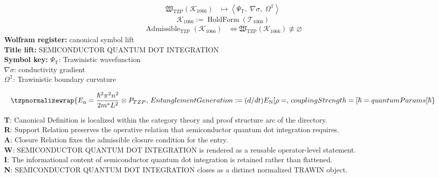 \noindent
\begin{minipage}[t]{0.48\linewidth}
\begingroup
\small
\[
\begin{aligned}
\mathfrak{W}_{\mathrm{TZP}}\!\left(\mathcal{K}_{1066}\right)
&\longmapsto
\left\langle \Psi_{\mathrm{T}},\; \nabla\sigma,\; \Omega^{\mathbb{T}} \right\rangle
\end{aligned}
\]
\[
\mathcal{K}_{1066}
:=
\operatorname{HoldForm}\!\left(\mathcal{T}_{1066}\right)
\]
\[
\begin{aligned}
\operatorname{Admissible}_{\mathrm{TZP}}\!\left(\mathcal{K}_{1066}\right)
&\Longleftrightarrow
\mathfrak{W}_{\mathrm{TZP}}\!\left(\mathcal{K}_{1066}\right)\not\equiv\varnothing
\end{aligned}
\]
\textbf{Wolfram register:} canonical symbol lift\\
\textbf{Title lift:} SEMICONDUCTOR QUANTUM DOT INTEGRATION\\
\textbf{Symbol key:} \(\Psi_{\mathrm{T}}\): Trawinistic wavefunction\\ \(\nabla\sigma\): conductivity gradient\\ \(\Omega^{\mathbb{T}}\): Trawinistic boundary curvature
\par
\endgroup
\end{minipage}\hfill
\begin{minipage}[t]{0.48\linewidth}
\[
\tzpnormalizewrap{E_{\mathrm{n}} = \frac{\hbar^2 \pi^2 n^2}{2m^* L^2} \otimes P_{TZP},\,EntanglementGeneration := (d/dt) E_{\mathrm{N}}[\rho =,\,couplingStrength = [{\hbar = quantumParams[\hbar}}
\]

\small
\textbf{T}: Canonical Definition is localized within the category theory and proof structure arc of the directory.\\
\textbf{R}: Support Relation preserves the operative relation that semiconductor quantum dot integration requires.\\
\textbf{A}: Closure Relation fixes the admissible closure condition for the entry.\\
\textbf{W}: SEMICONDUCTOR QUANTUM DOT INTEGRATION is rendered as a reusable operator-level statement.\\
\textbf{I}: The informational content of semiconductor quantum dot integration is retained rather than flattened.\\
\textbf{N}: SEMICONDUCTOR QUANTUM DOT INTEGRATION closes as a distinct normalized TRAWIN object.
\normalsize
\end{minipage}

